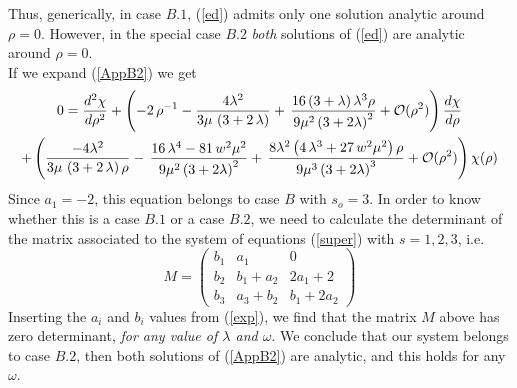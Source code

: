 \documentclass[12pt,aps,floats,showpacs,amssymb,tightenlines]{revtex4}
\newcommand{\w}{\omega}
\begin{document}
Thus, generically, in case $B.1$, (\ref{ed}) admits only one solution analytic
around $\rho=0$. However, in the special case $B.2$ {\em both}
solutions of (\ref{ed}) are analytic around $\rho=0$. \\
If we expand
(\ref{AppB2}) we get
   \begin{multline} \label{exp}
0 = \frac{d^2 \chi}{d \rho^2} + \left( -2\,{\rho}^{-1}-{\frac
{4{\lambda}^{2}}{3 \mu\, \left( 3+2\,\lambda
 \right) }}+\,{\frac {16 \left( 3+\lambda \right) {
\lambda}^{3}\rho}{9{\mu}^{2} \left( 3+2 \lambda
 \right)^2 }} + {\cal O} (\rho^2) \right) \frac{d \chi}{d \rho} \\+
 \left({\frac {-4{\lambda}^{2}}{3 \mu\, \left( 3+2\,\lambda \right) \rho}}-
\,{\frac {16\,{\lambda}^{4}-81\,{w}^{2}{\mu}^{2}}{9{\mu}^{2} \left(
3+2\lambda \right)^2 }}+\,{\frac {8{ \lambda}^{2} \left(
4\,{\lambda}^{3}+27\,{w}^{2}{\mu}^{2} \right) \rho }{9{\mu}^{3}
  \left( 3+2\lambda \right)^3 }} + {\cal{O}}(\rho^2) \right)
\chi(\rho)
 \end{multline}
 Since $a_1=-2$,  this equation belongs to case $B$ with $s_o=3$.
 In order to know whether this is a case $B.1$ or a case $B.2$,
 we need to calculate the determinant of the matrix associated to
 the system of equations (\ref{super}) with $s=1,2,3$, i.e.
 \begin{equation} M = \left(
 \begin{matrix} b_1 & a_1 & 0 \\ b_2 & b_1+a_2 & 2 a_1+2\\
 b_3 & a_3+b_2 & b_1+2 a_2 \end{matrix}  \right)
 \end{equation}
Inserting the $a_i$ and $b_i$ values from (\ref{exp}), we find that
the matrix $M$ above has zero determinant, {\em for any value of
$\lambda$ and  $\w$}. We conclude that our system belongs to case
$B.2$, then both solutions of (\ref{AppB2}) are analytic, and this
holds for any
$\w$.\\
\end{document}
